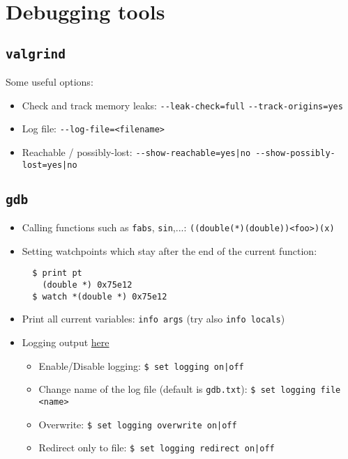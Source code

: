 \documentclass[a4paper,12pt,%
              final%
              ]{article}
\begin{document}
\section{Debugging tools}
\subsection{\texttt{valgrind}}
Some useful options:
\begin{itemize}
  \item Check and track memory leaks: \verb|--leak-check=full| \verb|--track-origins=yes|
  \item Log file: \verb|--log-file=<filename>|
  \item Reachable / possibly-lost: \verb!--show-reachable=yes|no --show-possibly-lost=yes|no!
\end{itemize}

\subsection{\texttt{gdb}}
\label{sec:gdb}
\begin{itemize}
  \item Calling functions such as \texttt{fabs}, \texttt{sin},...: \texttt{((double(*)(double))<foo>)(x)}
  \item Setting watchpoints which stay after the end of the current function:
\begin{verbatim}
  $ print pt
    (double *) 0x75e12
  $ watch *(double *) 0x75e12
\end{verbatim}
  \item Print all current variables: \texttt{info args} (try also \texttt{info locals})
  \item Logging output \href{https://sourceware.org/gdb/onlinedocs/gdb/Logging-Output.html}{here}
    \begin{itemize}
      \item Enable/Disable logging: \verb!$ set logging on|off!
      \item Change name of the log file (default is \texttt{gdb.txt}): \verb|$ set logging file <name>|
      \item Overwrite: \verb!$ set logging overwrite on|off!
      \item Redirect only to file: \verb!$ set logging redirect on|off!
    \end{itemize}
\end{itemize}
\end{document}
